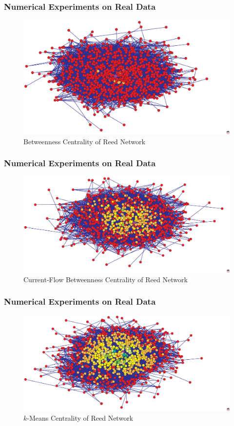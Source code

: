 \documentclass{beamer}
\begin{document}
\begin{frame}
\frametitle{Numerical Experiments on Real Data}
\begin{figure}[h]
\begin{center}
\includegraphics[width=0.76\columnwidth]{reed_betweenness}
\end{center}
\caption{Betweenness Centrality of Reed Network}
\label{fig:Betweenness Centrality - Reed}
\end{figure}
\end{frame}

\begin{frame}
\frametitle{Numerical Experiments on Real Data}
\begin{figure}[h]
\begin{center}
\includegraphics[width=0.76\columnwidth]{reed_current_flow_betweenness}
\end{center}
\caption{Current-Flow Betweenness Centrality of Reed Network}
\label{fig:Current Flow Betweenness Centrality - Reed}
\end{figure}
\end{frame}

\begin{frame}
\frametitle{Numerical Experiments on Real Data}
\begin{figure}[h]
\begin{center}
\includegraphics[width=0.76\columnwidth]{reed_k_centrality}
\end{center}
\caption{$k$-Means Centrality of Reed Network}
\label{fig:K-Centrality - Reed}
\end{figure}
\end{frame}
\end{document}
